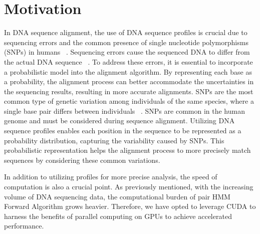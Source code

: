\documentclass[PhD]{PHlab-thesis}
\begin{document}
\section{Motivation}
In DNA sequence alignment, the use of DNA sequence profiles is crucial due to sequencing errors and the common presence of single nucleotide polymorphisms (SNPs) in humans ~\cite{Xuhua,Dimitrios}. Sequencing errors cause the sequenced DNA to differ from the actual DNA sequence ~\cite{sequencingError}. To address these errors, it is essential to incorporate a probabilistic model into the alignment algorithm. By representing each base as a probability, the alignment process can better accommodate the uncertainties in the sequencing results, resulting in more accurate alignments. SNPs are the most common type of genetic variation among individuals of the same species, where a single base pair differs between individuals ~\cite{Xuhua}. SNPs are common in the human genome and must be considered during sequence alignment. Utilizing DNA sequence profiles enables each position in the sequence to be represented as a probability distribution, capturing the variability caused by SNPs. This probabilistic representation helps the alignment process to more precisely match sequences by considering these common variations.\newline

In addition to utilizing profiles for more precise analysis, the speed of computation is also a crucial point. As previously mentioned, with the increasing volume of DNA sequencing data, the computational burden of pair HMM Forward Algorithm grows heavier. Therefore, we have opted to leverage CUDA to harness the benefits of parallel computing on GPUs to achieve accelerated performance.\newline
\end{document}
